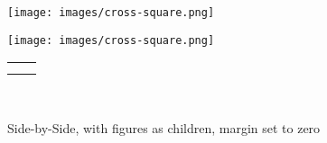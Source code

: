 \documentclass[10pt,]{article}
\theoremstyle{plain}
\theoremstyle{definition}
\theoremstyle{definition}
\theoremstyle{definition}
\theoremstyle{definition}
\theoremstyle{definition}
\theoremstyle{definition}
\numberwithin{equation}{section}
\newlength{\panelmax}
\begin{document}
\begin{figure}
\centering
{%
\setlength{\panelmax}{0pt}
\ifdefined\panelboxAimage\else\newsavebox{\panelboxAimage}\fi%
\begin{lrbox}{\panelboxAimage}
\texttt{[image: images/cross-square.png]}
\end{lrbox}
\ifdefined\phAimage\else\newlength{\phAimage}\fi%
\setlength{\phAimage}{\ht\panelboxAimage+\dp\panelboxAimage}
\settototalheight{\phAimage}{\usebox{\panelboxAimage}}
\setlength{\panelmax}{\maxof{\panelmax}{\phAimage}}
\ifdefined\panelboxBimage\else\newsavebox{\panelboxBimage}\fi%
\begin{lrbox}{\panelboxBimage}
\texttt{[image: images/cross-square.png]}
\end{lrbox}
\ifdefined\phBimage\else\newlength{\phBimage}\fi%
\setlength{\phBimage}{\ht\panelboxBimage+\dp\panelboxBimage}
\settototalheight{\phBimage}{\usebox{\panelboxBimage}}
\setlength{\panelmax}{\maxof{\panelmax}{\phBimage}}
\leavevmode%
\setlength{\tabcolsep}{0.125\linewidth}
\par\medskip\noindent
\begin{tabular}{@{}*{2}{c}@{}}
\begin{minipage}[c][\panelmax][t]{0.5\linewidth}\usebox{\panelboxAimage}\end{minipage}&
\begin{minipage}[c][\panelmax][t]{0.25\linewidth}\usebox{\panelboxBimage}\end{minipage}\tabularnewline
\parbox[t]{0.5\linewidth}{
}&
\parbox[t]{0.25\linewidth}{
}\end{tabular}\\
}%
\caption{Side-by-Side, with figures as children, margin set to zero\label{figure-51}}
\end{figure}
\end{document}
